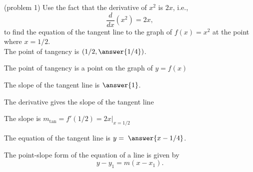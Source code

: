 \documentclass[handout]{ximera}
\begin{document}
\begin{problem}(problem 1)
Use the fact that the derivative of $x^2$ is $2x$,
i.e., 
\[
\frac{d}{dx}\left( x^2 \right) = 2x,
\]
to find the equation of the tangent line to the graph of 
$f(x) = x^2$ at the point where $x = 1/2$.\\

The point of tangency is $(1/2, \answer{1/4})$.\\

\begin{hint}
The point of tangency is a point on the graph of $y = f(x)$
\end{hint}


The slope of the tangent line is $\answer{1}$.\\
\begin{hint}
The derivative gives the slope of the tangent line
\end{hint}
\begin{hint}
The slope is $m_{\text{tan}} = f'(1/2) = 2x\big|_{x=1/2}$
\end{hint}


The equation of the tangent line is $y = \; \answer{x - 1/4}$.
\begin{hint}
The point-slope form of the equation of a line is given by
\[
 y - y_1 = m(x - x_1).
 \]
 \end{hint}
 
\end{problem}




\end{document}

